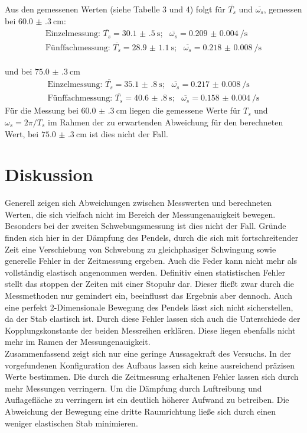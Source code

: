 Aus den gemessenen Werten (siehe Tabelle 3 und 4) folgt für $\overline{T_s}$ und $\overline{\omega_s}$, gemessen bei $\SI{60.0(3)}{\centi\metre}$:
\begin{equation*}
\begin{split}
 \text{Einzelmessung: }\overline{T_{s}} = \SI{30.1(5)}{\second}; \ \ \ \overline{\omega_s}= \SI{0.209(4)}{\per\second}\\
 \text{Fünffachmessung: }\overline{T_{s}} = \SI{28.9(11)}{\second}; \ \ \ \overline{\omega_s} = \SI{0.218(8)}{\per\second}
\end{split}
\end{equation*}
\\ und bei $\SI{75.0(3)}{\centi\metre}$
\begin{equation*}
\begin{split}
 \text{Einzelmessung: }\overline{T_{s}} = \SI{35.1(8)}{\second}; \ \ \ \overline{\omega_s} = \SI{0.217(8)}{\per\second}\\
 \text{Fünffachmessung: }\overline{T_{s}} = \SI{40.6(8)}{\second}; \ \ \ \overline{\omega_s} = \SI{0.158(4)}{\per\second}
\end{split}
\end{equation*}
Für die Messung bei $\SI{60.0(3)}{\centi\metre}$ liegen die gemessene Werte für $T_s$ und $ \omega_s = 2\pi/T_s$ im Rahmen der zu erwartenden Abweichung für den berechneten Wert,
bei $\SI{75.0(3)}{\centi\metre}$ ist dies nicht der Fall.
\section{Diskussion}
Generell zeigen sich Abweichungen zwischen Messwerten und berechneten Werten, die sich vielfach nicht im Bereich der Messungenauigkeit bewegen.
Besonders bei der zweiten Schwebungsmessung ist dies nicht der Fall. Gründe finden sich hier in der Dämpfung des Pendels, durch die sich mit fortschreitender Zeit eine
Verschiebung von Schwebung zu gleichphasiger Schwingung sowie generelle Fehler in der Zeitmessung ergeben. Auch die Feder kann nicht mehr als vollständig elastisch
angenommen werden. Definitiv einen statistischen Fehler stellt das stoppen der Zeiten mit einer Stopuhr dar. Dieser fließt zwar durch die Messmethoden nur gemindert ein,
beeinflusst das Ergebnis aber dennoch. Auch eine perfekt 2-Dimensionale Bewegung des Pendels lässt sich nicht sicherstellen, da der Stab elastisch ist.
Durch diese Fehler lassen sich auch die Unterschiede der Kopplungskonstante der beiden Messreihen erklären. Diese liegen ebenfalls nicht mehr im Ramen der Messungenauigkeit.
\\
Zusammenfassend zeigt sich nur eine geringe Aussagekraft des Versuchs. In der vorgefundenen Konfiguration des Aufbaus lassen sich keine ausreichend präzisen Werte bestimmen.
Die durch die Zeitmessung erhaltenen Fehler lassen sich durch mehr Messungen verringern. Um die Dämpfung durch Luftreibung und Auflagefläche zu verringern ist ein deutlich höherer
Aufwand zu betreiben. Die Abweichung der Bewegung eine dritte Raumrichtung ließe sich durch einen weniger elastischen Stab minimieren.

\newpage
\nocite{*}
\printbibliography
